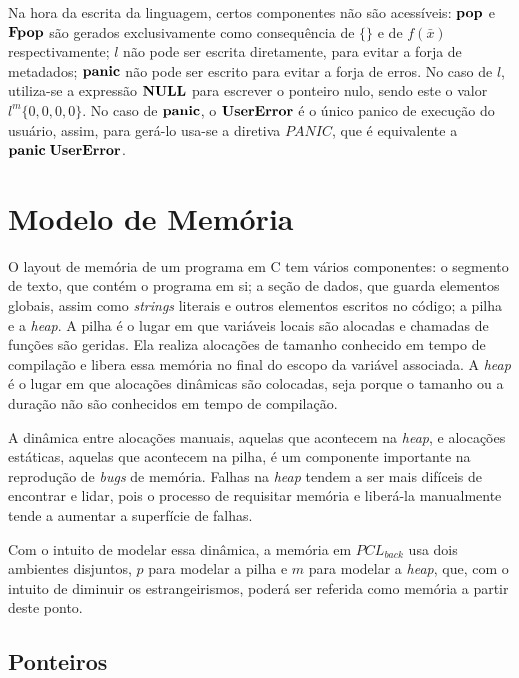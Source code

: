 Na hora da escrita da linguagem, certos componentes não são acessíveis: $\mathbf{pop}$ e $\mathbf{Fpop}$ são gerados exclusivamente como consequência de $\{\}$ e de $f(\bar x)$ respectivamente; $l$ não pode ser escrita diretamente, para evitar a forja de metadados; $\mathbf{panic}$ não pode ser escrito para evitar a forja de erros. No caso de $l$, utiliza-se a expressão $\mathbf{NULL}$ para escrever o ponteiro nulo, sendo este o valor $l^m\{0, 0, 0, 0\}$. No caso de $\mathbf{panic}$, o $\mathbf{UserError}$ é o único panico de execução do usuário, assim, para gerá-lo usa-se a diretiva $PANIC$, que é equivalente a $\mathbf{panic}\;\mathbf{UserError}$.

\section{Modelo de Memória}

O layout de memória de um programa em C tem vários componentes: o segmento de texto, que contém o programa em si; a seção de dados, que guarda elementos globais, assim como \emph{strings} literais e outros elementos escritos no código; a pilha e a \emph{heap}. A pilha é o lugar em que variáveis locais são alocadas e chamadas de funções são geridas. Ela realiza alocações de tamanho conhecido em tempo de compilação e libera essa memória no final do escopo da variável associada. A \emph{heap} é o lugar em que alocações dinâmicas são colocadas, seja porque o tamanho ou a duração não são conhecidos em tempo de compilação.

A dinâmica entre alocações manuais, aquelas que acontecem na \emph{heap}, e alocações estáticas, aquelas que acontecem na pilha, é um componente importante na reprodução de \emph{bugs} de memória. Falhas na \emph{heap} tendem a ser mais difíceis de encontrar e lidar, pois o processo de requisitar memória e liberá-la manualmente tende a aumentar a superfície de falhas. 

Com o intuito de modelar essa dinâmica, a memória em $PCL_{back}$ usa dois ambientes disjuntos, $p$ para modelar a pilha e $m$ para modelar a \emph{heap}, que, com o intuito de diminuir os estrangeirismos, poderá ser referida como memória a partir deste ponto. 

\subsection{Ponteiros}
\label{sec:pcl-back:ptr}

